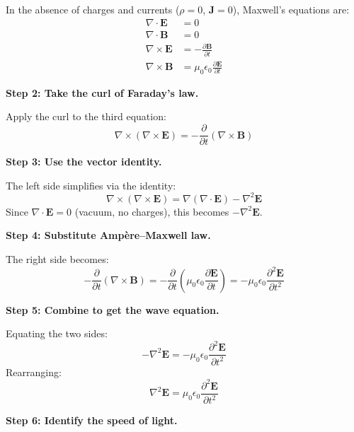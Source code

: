 \documentclass[11pt,openright]{book}
\begin{document}
In the absence of charges and currents ($\rho = 0$, $\mathbf{J} = 0$), Maxwell's equations are:
\begin{align}
\nabla \cdot \mathbf{E} &= 0 \\
\nabla \cdot \mathbf{B} &= 0 \\
\nabla \times \mathbf{E} &= -\frac{\partial \mathbf{B}}{\partial t} \\
\nabla \times \mathbf{B} &= \mu_0\epsilon_0\frac{\partial \mathbf{E}}{\partial t}
\end{align}

\textbf{Step 2: Take the curl of Faraday's law.}

Apply the curl to the third equation:
\begin{equation}
\nabla \times (\nabla \times \mathbf{E}) = -\frac{\partial}{\partial t}(\nabla \times \mathbf{B})
\end{equation}

\textbf{Step 3: Use the vector identity.}

The left side simplifies via the identity:
\begin{equation}
\nabla \times (\nabla \times \mathbf{E}) = \nabla(\nabla \cdot \mathbf{E}) - \nabla^2 \mathbf{E}
\end{equation}
Since $\nabla \cdot \mathbf{E} = 0$ (vacuum, no charges), this becomes $-\nabla^2 \mathbf{E}$.

\textbf{Step 4: Substitute Amp\`ere--Maxwell law.}

The right side becomes:
\begin{equation}
-\frac{\partial}{\partial t}(\nabla \times \mathbf{B}) = -\frac{\partial}{\partial t}\left(\mu_0\epsilon_0\frac{\partial \mathbf{E}}{\partial t}\right) = -\mu_0\epsilon_0\frac{\partial^2 \mathbf{E}}{\partial t^2}
\end{equation}

\textbf{Step 5: Combine to get the wave equation.}

Equating the two sides:
\begin{equation}
-\nabla^2 \mathbf{E} = -\mu_0\epsilon_0\frac{\partial^2 \mathbf{E}}{\partial t^2}
\end{equation}
Rearranging:
\begin{equation}
\boxed{\nabla^2 \mathbf{E} = \mu_0\epsilon_0\frac{\partial^2 \mathbf{E}}{\partial t^2}}
\end{equation}

\textbf{Step 6: Identify the speed of light.}
\end{document}
